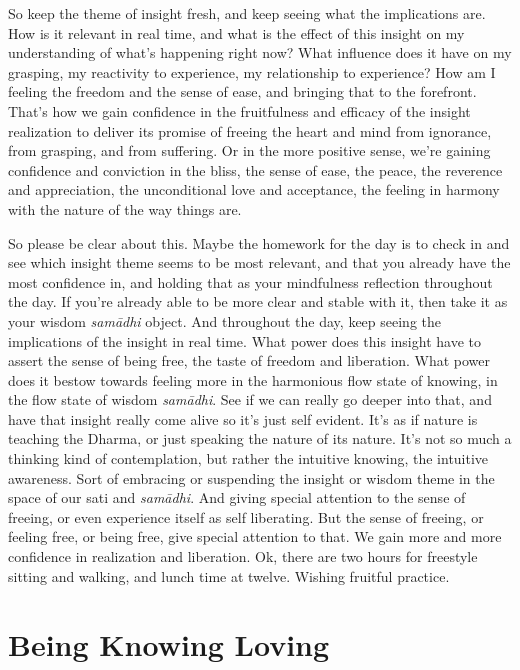 \documentclass[12pt,openany]{book}
\begin{document}
So keep the theme of insight fresh, and keep seeing what the implications are. How is it relevant in real time, and what is the effect of this insight on my understanding of what’s happening right now? What influence does it have on my grasping, my reactivity to experience, my relationship to experience? How am I feeling the freedom and the sense of ease, and bringing that to the forefront. That's how we gain confidence in the fruitfulness and efficacy of the insight realization to deliver its promise of freeing the heart and mind from ignorance, from grasping, and from suffering. Or in the more positive sense, we're gaining confidence and conviction in the bliss, the sense of ease, the peace, the reverence and appreciation, the unconditional love and acceptance, the feeling in harmony with the nature of the way things are.

So please be clear about this. Maybe the homework for the day is to check in and see which insight theme seems to be most relevant, and that you already have the most confidence in, and holding that as your mindfulness reflection throughout the day. If you’re already able to be more clear and stable with it, then take it as your wisdom \textit{samādhi} object. And throughout the day, keep seeing the implications of the insight in real time. What power does this insight have to assert the sense of being free, the taste of freedom and liberation. What power does it bestow towards feeling more in the harmonious flow state of knowing, in the flow state of wisdom \textit{samādhi}. See if we can really go deeper into that, and have that insight really come alive so it's just self evident. It’s as if nature is teaching the Dhar\-ma, or just speaking the nature of its nature. It’s not so much a thinking kind of contemplation, but rather the intuitive knowing, the intuitive awareness. Sort of embracing or suspending the insight or wisdom theme in the space of our sati and \textit{samādhi}. And giving special attention to the sense of freeing, or even experience itself as self liberating. But the sense of freeing, or feeling free, or being free, give special attention to that. We gain more and more confidence in realization and liberation. Ok, there are two hours for freestyle sitting and walking, and lunch time at twelve. Wishing fruitful practice. 

\chapter*{Being Knowing Loving}
\end{document}
